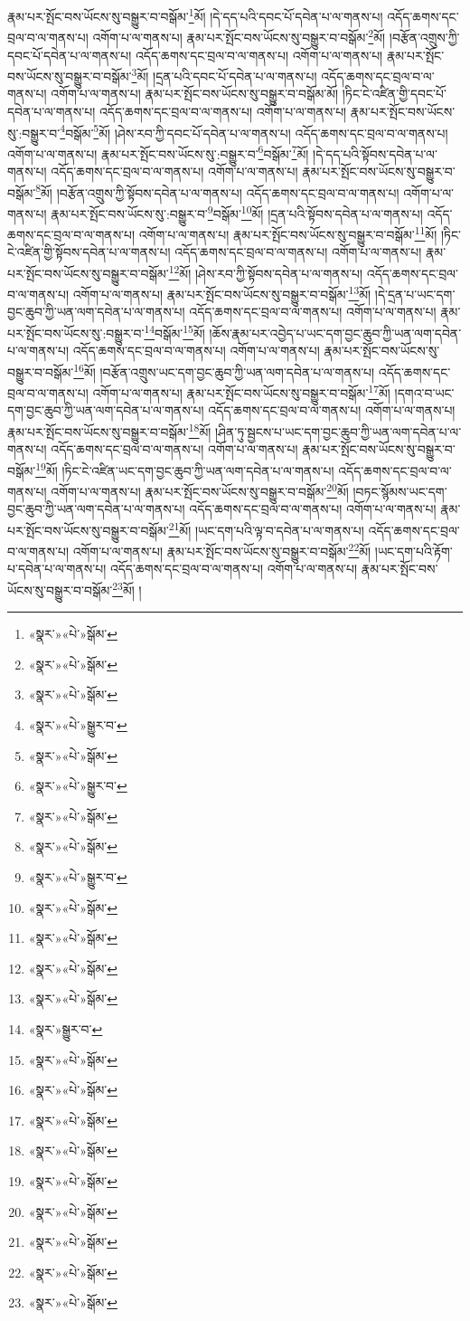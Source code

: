 རྣམ་པར་སྤོང་བས་ཡོངས་སུ་བསྒྱུར་བ་བསྒོམ་\footnote{«སྣར་»«པེ་»སྒོམ་}མོ། །དེ་དད་པའི་དབང་པོ་དབེན་པ་ལ་གནས་པ། འདོད་ཆགས་དང་བྲལ་བ་ལ་གནས་པ། འགོག་པ་ལ་གནས་པ། རྣམ་པར་སྤོང་བས་ཡོངས་སུ་བསྒྱུར་བ་བསྒོམ་\footnote{«སྣར་»«པེ་»སྒོམ་}མོ། །བརྩོན་འགྲུས་ཀྱི་དབང་པོ་དབེན་པ་ལ་གནས་པ། འདོད་ཆགས་དང་བྲལ་བ་ལ་གནས་པ། འགོག་པ་ལ་གནས་པ། རྣམ་པར་སྤོང་བས་ཡོངས་སུ་བསྒྱུར་བ་བསྒོམ་\footnote{«སྣར་»«པེ་»སྒོམ་}མོ། །དྲན་པའི་དབང་པོ་དབེན་པ་ལ་གནས་པ། འདོད་ཆགས་དང་བྲལ་བ་ལ་གནས་པ། འགོག་པ་ལ་གནས་པ། རྣམ་པར་སྤོང་བས་ཡོངས་སུ་བསྒྱུར་བ་བསྒོམ་མོ། །ཏིང་ངེ་འཛིན་གྱི་དབང་པོ་དབེན་པ་ལ་གནས་པ། འདོད་ཆགས་དང་བྲལ་བ་ལ་གནས་པ། འགོག་པ་ལ་གནས་པ། རྣམ་པར་སྤོང་བས་ཡོངས་སུ་:བསྒྱུར་བ་\footnote{«སྣར་»«པེ་»སྒྱུར་བ་}བསྒོམ་\footnote{«སྣར་»«པེ་»སྒོམ་}མོ། །ཤེས་རབ་ཀྱི་དབང་པོ་དབེན་པ་ལ་གནས་པ། འདོད་ཆགས་དང་བྲལ་བ་ལ་གནས་པ། འགོག་པ་ལ་གནས་པ། རྣམ་པར་སྤོང་བས་ཡོངས་སུ་:བསྒྱུར་བ་\footnote{«སྣར་»«པེ་»སྒྱུར་བ་}བསྒོམ་\footnote{«སྣར་»«པེ་»སྒོམ་}མོ། །དེ་དད་པའི་སྟོབས་དབེན་པ་ལ་གནས་པ། འདོད་ཆགས་དང་བྲལ་བ་ལ་གནས་པ། འགོག་པ་ལ་གནས་པ། རྣམ་པར་སྤོང་བས་ཡོངས་སུ་བསྒྱུར་བ་བསྒོམ་\footnote{«སྣར་»«པེ་»སྒོམ་}མོ། །བརྩོན་འགྲུས་ཀྱི་སྟོབས་དབེན་པ་ལ་གནས་པ། འདོད་ཆགས་དང་བྲལ་བ་ལ་གནས་པ། འགོག་པ་ལ་གནས་པ། རྣམ་པར་སྤོང་བས་ཡོངས་སུ་:བསྒྱུར་བ་\footnote{«སྣར་»«པེ་»སྒྱུར་བ་}བསྒོམ་\footnote{«སྣར་»«པེ་»སྒོམ་}མོ། །དྲན་པའི་སྟོབས་དབེན་པ་ལ་གནས་པ། འདོད་ཆགས་དང་བྲལ་བ་ལ་གནས་པ། འགོག་པ་ལ་གནས་པ། རྣམ་པར་སྤོང་བས་ཡོངས་སུ་བསྒྱུར་བ་བསྒོམ་\footnote{«སྣར་»«པེ་»སྒོམ་}མོ། །ཏིང་ངེ་འཛིན་གྱི་སྟོབས་དབེན་པ་ལ་གནས་པ། འདོད་ཆགས་དང་བྲལ་བ་ལ་གནས་པ། འགོག་པ་ལ་གནས་པ། རྣམ་པར་སྤོང་བས་ཡོངས་སུ་བསྒྱུར་བ་བསྒོམ་\footnote{«སྣར་»«པེ་»སྒོམ་}མོ། །ཤེས་རབ་ཀྱི་སྟོབས་དབེན་པ་ལ་གནས་པ། འདོད་ཆགས་དང་བྲལ་བ་ལ་གནས་པ། འགོག་པ་ལ་གནས་པ། རྣམ་པར་སྤོང་བས་ཡོངས་སུ་བསྒྱུར་བ་བསྒོམ་\footnote{«སྣར་»«པེ་»སྒོམ་}མོ། །དེ་དྲན་པ་ཡང་དག་བྱང་ཆུབ་ཀྱི་ཡན་ལག་དབེན་པ་ལ་གནས་པ། འདོད་ཆགས་དང་བྲལ་བ་ལ་གནས་པ། འགོག་པ་ལ་གནས་པ། རྣམ་པར་སྤོང་བས་ཡོངས་སུ་:བསྒྱུར་བ་\footnote{«སྣར་»སྒྱུར་བ་}བསྒོམ་\footnote{«སྣར་»«པེ་»སྒོམ་}མོ། །ཆོས་རྣམ་པར་འབྱེད་པ་ཡང་དག་བྱང་ཆུབ་ཀྱི་ཡན་ལག་དབེན་པ་ལ་གནས་པ། འདོད་ཆགས་དང་བྲལ་བ་ལ་གནས་པ། འགོག་པ་ལ་གནས་པ། རྣམ་པར་སྤོང་བས་ཡོངས་སུ་བསྒྱུར་བ་བསྒོམ་\footnote{«སྣར་»«པེ་»སྒོམ་}མོ། །བརྩོན་འགྲུས་ཡང་དག་བྱང་ཆུབ་ཀྱི་ཡན་ལག་དབེན་པ་ལ་གནས་པ། འདོད་ཆགས་དང་བྲལ་བ་ལ་གནས་པ། འགོག་པ་ལ་གནས་པ། རྣམ་པར་སྤོང་བས་ཡོངས་སུ་བསྒྱུར་བ་བསྒོམ་\footnote{«སྣར་»«པེ་»སྒོམ་}མོ། །དགའ་བ་ཡང་དག་བྱང་ཆུབ་ཀྱི་ཡན་ལག་དབེན་པ་ལ་གནས་པ། འདོད་ཆགས་དང་བྲལ་བ་ལ་གནས་པ། འགོག་པ་ལ་གནས་པ། རྣམ་པར་སྤོང་བས་ཡོངས་སུ་བསྒྱུར་བ་བསྒོམ་\footnote{«སྣར་»«པེ་»སྒོམ་}མོ། །ཤིན་ཏུ་སྦྱངས་པ་ཡང་དག་བྱང་ཆུབ་ཀྱི་ཡན་ལག་དབེན་པ་ལ་གནས་པ། འདོད་ཆགས་དང་བྲལ་བ་ལ་གནས་པ། འགོག་པ་ལ་གནས་པ། རྣམ་པར་སྤོང་བས་ཡོངས་སུ་བསྒྱུར་བ་བསྒོམ་\footnote{«སྣར་»«པེ་»སྒོམ་}མོ། །ཏིང་ངེ་འཛིན་ཡང་དག་བྱང་ཆུབ་ཀྱི་ཡན་ལག་དབེན་པ་ལ་གནས་པ། འདོད་ཆགས་དང་བྲལ་བ་ལ་གནས་པ། འགོག་པ་ལ་གནས་པ། རྣམ་པར་སྤོང་བས་ཡོངས་སུ་བསྒྱུར་བ་བསྒོམ་\footnote{«སྣར་»«པེ་»སྒོམ་}མོ། །བཏང་སྙོམས་ཡང་དག་བྱང་ཆུབ་ཀྱི་ཡན་ལག་དབེན་པ་ལ་གནས་པ། འདོད་ཆགས་དང་བྲལ་བ་ལ་གནས་པ། འགོག་པ་ལ་གནས་པ། རྣམ་པར་སྤོང་བས་ཡོངས་སུ་བསྒྱུར་བ་བསྒོམ་\footnote{«སྣར་»«པེ་»སྒོམ་}མོ། །ཡང་དག་པའི་ལྟ་བ་དབེན་པ་ལ་གནས་པ། འདོད་ཆགས་དང་བྲལ་བ་ལ་གནས་པ། འགོག་པ་ལ་གནས་པ། རྣམ་པར་སྤོང་བས་ཡོངས་སུ་བསྒྱུར་བ་བསྒོམ་\footnote{«སྣར་»«པེ་»སྒོམ་}མོ། །ཡང་དག་པའི་རྟོག་པ་དབེན་པ་ལ་གནས་པ། འདོད་ཆགས་དང་བྲལ་བ་ལ་གནས་པ། འགོག་པ་ལ་གནས་པ། རྣམ་པར་སྤོང་བས་ཡོངས་སུ་བསྒྱུར་བ་བསྒོམ་\footnote{«སྣར་»«པེ་»སྒོམ་}མོ། །
